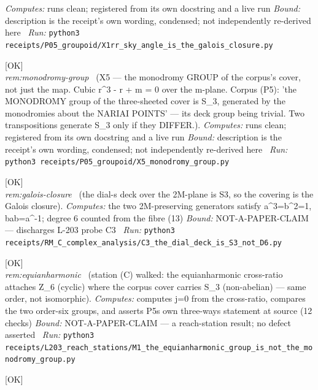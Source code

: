 \begin{description}
\emph{Computes:} runs clean; registered from its own docstring and a live run
 \emph{Bound:} description is the receipt's own wording, condensed; not independently re-derived here
\ \emph{Run:} \texttt{python3 receipts/P05\_groupoid/X1rr\_sky\_angle\_is\_the\_galois\_closure.py}
\item[\rcptlabel{X5_monodromy_group}{P5R15}\textbf{P5R15}\quad\texttt{X5\_monodromy\_group}]\hfill\textsf{[OK]}\\
\textit{rem:monodromy-group} \ (X5 --- the monodromy GROUP of the corpus's cover, not just the map. Cubic r\textasciicircum{}3 - r + m = 0 over the m-plane. Corpus (P5): 'the MONODROMY group of the three-sheeted cover is S\_3, generated by the monodromies about the NARIAI POINTS' --- its deck group being trivial. Two transpositions generate S\_3 only if they DIFFER.). 
\emph{Computes:} runs clean; registered from its own docstring and a live run
 \emph{Bound:} description is the receipt's own wording, condensed; not independently re-derived here
\ \emph{Run:} \texttt{python3 receipts/P05\_groupoid/X5\_monodromy\_group.py}
\item[\label{rcpt:C3_the_dial_deck_is_S3_not_D6}\textbf{}\quad\texttt{C3\_the\_dial\_deck\_is\_S3\_not\_D6}]\hfill\textsf{[OK]}\\
\textit{rem:galois-closure} \ (the dial-s deck over the 2M-plane is S3, so the covering is the Galois closure). 
\emph{Computes:} the two 2M-preserving generators satisfy a\textasciicircum{}3=b\textasciicircum{}2=1, bab=a\textasciicircum{}-1; degree 6 counted from the fibre (13)
 \emph{Bound:} NOT-A-PAPER-CLAIM --- discharges L-203 probe C3
\ \emph{Run:} \texttt{python3 receipts/RM\_C\_complex\_analysis/C3\_the\_dial\_deck\_is\_S3\_not\_D6.py}
\item[\label{rcpt:M1_the_equianharmonic_group_is_not_the_monodromy_group}\textbf{}\quad\texttt{M1\_the\_equianharmonic\_group\_is\_not\_the\_monodromy\_group}]\hfill\textsf{[OK]}\\
\textit{rem:equianharmonic} \ (station (C) walked: the equianharmonic cross-ratio attaches Z\_6 (cyclic) where the corpus cover carries S\_3 (non-abelian) --- same order, not isomorphic). 
\emph{Computes:} computes j=0 from the cross-ratio, compares the two order-six groups, and asserts P5s own three-ways statement at source (12 checks)
 \emph{Bound:} NOT-A-PAPER-CLAIM --- a reach-station result; no defect asserted
\ \emph{Run:} \texttt{python3 receipts/L203\_reach\_stations/M1\_the\_equianharmonic\_group\_is\_not\_the\_monodromy\_group.py}
\item[\label{rcpt:M4_four_objects_one_word}\textbf{}\quad\texttt{M4\_four\_objects\_one\_word}]\hfill\textsf{[OK]}\\

\end{description}
